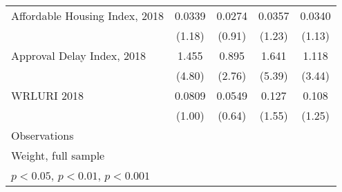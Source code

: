 \begin{table}[htbp]
\begin{tabular}{l*{4}{c}}
\addlinespace
Affordable Housing Index, 2018&      0.0339         &      0.0274         &      0.0357         &      0.0340         \\
                    &      (1.18)         &      (0.91)         &      (1.23)         &      (1.13)         \\
\addlinespace
Approval Delay Index, 2018&       1.455\sym{***}&       0.895\sym{**} &       1.641\sym{***}&       1.118\sym{***}\\
                    &      (4.80)         &      (2.76)         &      (5.39)         &      (3.44)         \\
\addlinespace
WRLURI 2018         &      0.0809         &      0.0549         &       0.127         &       0.108         \\
                    &      (1.00)         &      (0.64)         &      (1.55)         &      (1.25)         \\
\midrule
Observations        &                     &                     &                     &                     \\
\bottomrule
\multicolumn{5}{l}{\footnotesize Weight, full sample}\\
\multicolumn{5}{l}{\footnotesize \sym{*} \(p<0.05\), \sym{**} \(p<0.01\), \sym{***} \(p<0.001\)}\\
\end{tabular}
\end{table}
